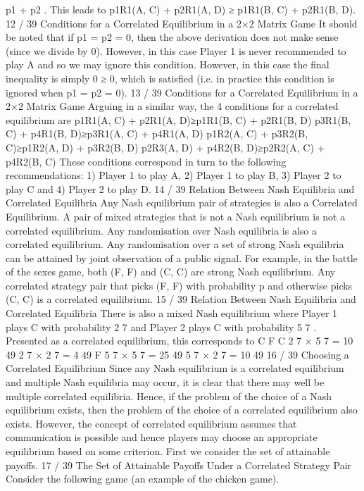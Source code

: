 p1 + p2
.
This leads to
p1R1(A, C) + p2R1(A, D) ≥ p1R1(B, C) + p2R1(B, D).
12 / 39
Conditions for a Correlated Equilibrium in a 2×2 Matrix
Game
It should be noted that if p1 = p2 = 0, then the above derivation
does not make sense (since we divide by 0).
However, in this case Player 1 is never recommended to play A and
so we may ignore this condition.
However, in this case the final inequality is simply 0 ≥ 0, which is
satisfied (i.e. in practice this condition is ignored when
p1 = p2 = 0).
13 / 39
Conditions for a Correlated Equilibrium in a 2×2 Matrix
Game
Arguing in a similar way, the 4 conditions for a correlated
equilibrium are
p1R1(A, C) + p2R1(A, D)≥p1R1(B, C) + p2R1(B, D)
p3R1(B, C) + p4R1(B, D)≥p3R1(A, C) + p4R1(A, D)
p1R2(A, C) + p3R2(B, C)≥p1R2(A, D) + p3R2(B, D)
p2R3(A, D) + p4R2(B, D)≥p2R2(A, C) + p4R2(B, C)
These conditions correspond in turn to the following
recommendations: 1) Player 1 to play A, 2) Player 1 to play B, 3)
Player 2 to play C and 4) Player 2 to play D.
14 / 39
Relation Between Nash Equilibria and Correlated Equilibria
Any Nash equilibrium pair of strategies is also a Correlated
Equilibrium. A pair of mixed strategies that is not a Nash
equilibrium is not a correlated equilibrium.
Any randomisation over Nash equilibria is also a correlated
equilibrium. Any randomisation over a set of strong Nash equilibria
can be attained by joint observation of a public signal.
For example, in the battle of the sexes game, both (F, F) and
(C, C) are strong Nash equilibrium. Any correlated strategy pair
that picks (F, F) with probability p and otherwise picks (C, C) is a
correlated equilibrium.
15 / 39
Relation Between Nash Equilibria and Correlated Equilibria
There is also a mixed Nash equilibrium where Player 1 plays C
with probability 2
7
and Player 2 plays C with probability 5
7
.
Presented as a correlated equilibrium, this corresponds to
C F
C
2
7 ×
5
7 =
10
49
2
7 ×
2
7 =
4
49
F
5
7 ×
5
7 =
25
49
5
7 ×
2
7 =
10
49
16 / 39
Choosing a Correlated Equilibrium
Since any Nash equilibrium is a correlated equilibrium and multiple
Nash equilibria may occur, it is clear that there may well be
multiple correlated equilibria.
Hence, if the problem of the choice of a Nash equilibrium exists,
then the problem of the choice of a correlated equilibrium also
exists.
However, the concept of correlated equilibrium assumes that
communication is possible and hence players may choose an
appropriate equilibrium based on some criterion. First we consider
the set of attainable payoffs.
17 / 39
The Set of Attainable Payoffs Under a Correlated Strategy
Pair
Consider the following game (an example of the chicken game).

